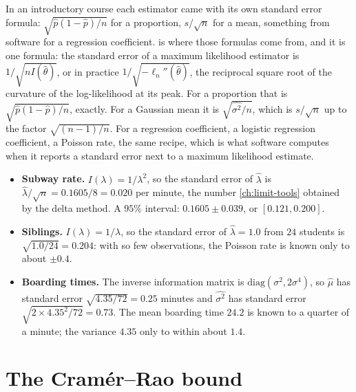\begin{bridge}
In an introductory course each estimator came with its own standard error formula: $\sqrt{\hat{p}(1-\hat{p})/n}$ for a proportion, $s/\sqrt{n}$ for a mean, something from software for a regression coefficient.
 is where those formulas come from, and it is one formula: the standard error of a maximum likelihood estimator is $1/\sqrt{nI(\hat{\theta})}$, or in practice $1/\sqrt{-\ell_n''(\hat{\theta})}$, the reciprocal square root of the curvature of the log-likelihood at its peak.
For a proportion that is $\sqrt{\hat{p}(1 - \hat{p})/n}$, exactly.
For a Gaussian mean it is $\sqrt{\widehat{\sigma^2}/n}$, which is $s/\sqrt{n}$ up to the factor $\sqrt{(n-1)/n}$.
For a regression coefficient, a logistic regression coefficient, a Poisson rate, the same recipe, which is what software computes when it reports a standard error next to a maximum likelihood estimate.
\end{bridge}

\begin{worked}
\begin{itemize}
\item \textbf{Subway rate.} $I(\lambda) = 1/\lambda^2$, so the standard error of $\hat{\lambda}$ is $\hat{\lambda}/\sqrt{n} = 0.1605/8 = 0.020$ per minute, the number \cref{ch:limit-tools} obtained by the delta method. A $95\%$ interval: $0.1605 \pm 0.039$, or $[0.121, 0.200]$.
\item \textbf{Siblings.} $I(\lambda) = 1/\lambda$, so the standard error of $\hat{\lambda} = 1.0$ from $24$ students is $\sqrt{1.0/24} = 0.204$: with so few observations, the Poisson rate is known only to about $\pm 0.4$.
\item \textbf{Boarding times.} The inverse information matrix is $\mathrm{diag}(\sigma^2, 2\sigma^4)$, so $\hat{\mu}$ has standard error $\sqrt{4.35/72} = 0.25$ minutes and $\widehat{\sigma^2}$ has standard error $\sqrt{2 \times 4.35^2/72} = 0.73$. The mean boarding time $24.2$ is known to a quarter of a minute; the variance $4.35$ only to within about $1.4$.
\end{itemize}
\end{worked}

\section{The Cram\'er--Rao bound}
\label{sec:mle-cramer-rao}

